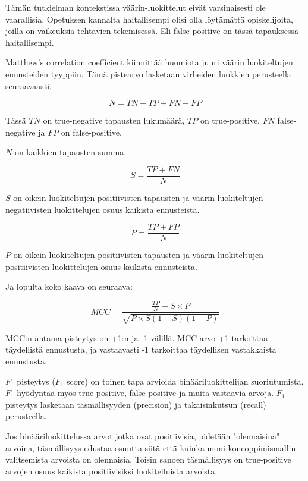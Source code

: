 \documentclass[finnish,twoside,openright]{HYgraduMLDS}
\begin{document}
Tämän tutkielman kontekstissa väärin-luokittelut eivät varsinaisesti ole vaarallisia. Opetuksen kannalta haitallisempi olisi olla löytämättä opiskelijoita, joilla on vaikeuksia tehtävien tekemisessä. Eli false-positive on tässä tapauksessa haitallisempi.

Matthew's correlation coefficient\cite{MATTHEWS1975442} kiinnittää huomiota juuri väärin luokiteltujen ennusteiden tyyppiin. Tämä pistearvo lasketaan virheiden luokkien perusteella seuraavaasti.

\begin{equation}
    N = TN + TP + FN + FP
\end{equation}

Tässä $TN$ on true-negative tapausten lukumäärä, $TP$ on true-positive, $FN$ false-negative ja $FP$ on false-positive.

$N$ on kaikkien tapausten summa.

\begin{equation} \label{eq:mcc-s}
    S = \frac{TP + FN}{N}
\end{equation}

$S$ on oikein luokiteltujen positiivisten tapausten ja väärin luokiteltujen negatiivisten luokittelujen osuus kaikista ennusteista.

\begin{equation} \label{eq:mcc-p}
    P = \frac{TP + FP}{N}
\end{equation}

$P$ on oikein luokiteltujen positiivisten tapausten ja väärin luokiteltujen positiivisten luokittelujen osuus kaikista ennusteista.

Ja lopulta koko kaava on seuraava:

\begin{equation} \label{eq:mcc}
    MCC = \frac{\frac{TP}{N} - S \times P}{\sqrt{P \times S (1 - S) (1 - P)}}
\end{equation}

MCC:n antama pisteytys on +1:n ja -1 välillä. MCC arvo +1 tarkoittaa täydellistä ennustusta, ja vastaavasti -1 tarkoittaa täydellisen vastakkaista ennustusta.


$F_1$ pisteytys ($F_1$ score) on toinen tapa arvioida binääriluokittelijan suoriutumista\cite{sasaki2007truth}. $F_1$ hyödyntää myös true-positive, false-positive ja muita vastaavia arvoja. $F_1$ pisteytys lasketaan täsmällisyyden (precision) ja takaisinkutsun (recall) perusteella. 

Jos binääriluokittelussa arvot jotka ovat positiivisia, pidetään "olennaisina" arvoina, täsmällisyys edustaa osuutta siitä että kuinka moni koneoppimismallin valitsemista arvoista on olennaisia. Toisin sanoen täsmällisyys on true-positive arvojen osuus kaikista positiivisiksi luokitelluista arvoista.
\end{document}
